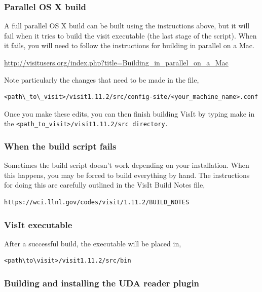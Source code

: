 \documentclass[12pt]{article}
\begin{document}
\normalfont  
\subsubsection{Parallel OS X build}
\label{sec:ParallelOSXBuild}

A full parallel OS X build can be built using the instructions above,
but it will fail when it tries to build the visit executable (the last
stage of the script). When it fails, you will need to follow the
instructions for building in parallel on a Mac.

\url{http://visitusers.org/index.php?title=Building_in_parallel_on_a_Mac}

  
Note particularly the changes that need to be made in the file, 

\begin{verbatim}
<path\_to\_visit>/visit1.11.2/src/config-site/<your_machine_name>.conf
\end{verbatim}

\normalfont Once you make these edits, you can then finish building VisIt by typing make in the \tt <path\_to\_visit>/visit1.11.2/src \normalfont directory.  

\subsubsection{When the build script fails}
\label{sec:WhenTheBuildsSriptFails}

Sometimes the build script doesn't work depending on your
installation. When this happens, you may be forced to build everything
by hand. The instructions for doing this are carefully outlined in the
VisIt Build Notes file,

\begin{verbatim}
https://wci.llnl.gov/codes/visit/1.11.2/BUILD_NOTES
\end{verbatim}

\subsubsection{VisIt executable}
\label{sec:VisItExecutable}

After a successful build, the executable will be placed in,

\begin{verbatim}
<path\to\visit>/visit1.11.2/src/bin
\end{verbatim}

\subsubsection{Building and installing the UDA reader plugin}
\label{sec:BuildingAndInstallingUDAPlugin}
\end{document}
